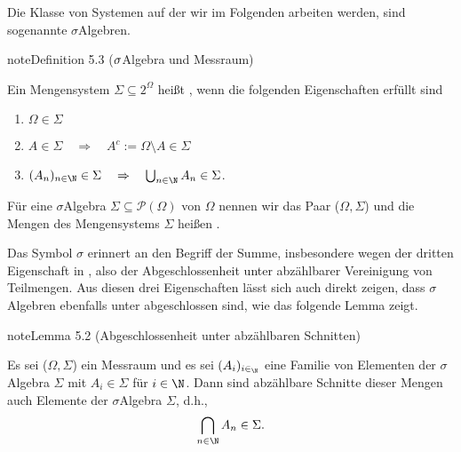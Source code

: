 \documentclass[letterpaper,10pt,german]{jupyterBook}
\begin{document}
\sphinxAtStartPar
Die Klasse von Systemen auf der wir im Folgenden arbeiten werden, sind sogenannte \(\sigma\)\sphinxhyphen{}Algebren.
\label{masstheorie/masstheorie:def:sigmaalgebra}
\begin{sphinxadmonition}{note}{Definition 5.3 (\protect\(\sigma\protect\)\sphinxhyphen{}Algebra und Messraum)}



\sphinxAtStartPar
Ein Mengensystem \(\Sigma \subseteq 2^\Omega\) heißt , wenn die folgenden Eigenschaften erfüllt sind
\begin{enumerate}
%
\item {} 
\sphinxAtStartPar
\(\Omega\in \Sigma\)

\item {} 
\sphinxAtStartPar
\(A\in \Sigma \quad \Rightarrow \quad A^c:=\Omega \setminus A\in \Sigma\)

\item {} 
\sphinxAtStartPar
\((A_n)_{n\in\N} \in \Sigma \quad \Rightarrow \quad \bigcup_{n\in \N} A_n\in \Sigma\).

\end{enumerate}

\sphinxAtStartPar
Für eine \(\sigma\)\sphinxhyphen{}Algebra \(\Sigma \subseteq \mathcal{P}(\Omega)\) von \(\Omega\) nennen wir das Paar (\(\Omega,\Sigma\))  und die Mengen des Mengensystems \(\Sigma\) heißen .
\end{sphinxadmonition}

\sphinxAtStartPar
Das Symbol \(\sigma\) erinnert an den Begriff der Summe, insbesondere wegen der dritten Eigenschaft in {\hyperref[\detokenize{masstheorie/masstheorie:def:sigmaalgebra}]{}}, also der Abgeschlossenheit unter abzählbarer Vereinigung von Teilmengen.
Aus diesen drei Eigenschaften lässt sich auch direkt zeigen, dass \(\sigma\)\sphinxhyphen{}Algebren ebenfalls unter  abgeschlossen sind, wie das folgende Lemma zeigt.
\label{masstheorie/masstheorie:lemma-6}
\begin{sphinxadmonition}{note}{Lemma 5.2 (Abgeschlossenheit unter abzählbaren Schnitten)}



\sphinxAtStartPar
Es sei (\(\Omega,\Sigma\)) ein Messraum und es sei \((A_i)_{i\in_\N}\) eine Familie von Elementen der \(\sigma\)\sphinxhyphen{}Algebra \(\Sigma\) mit \(A_i \in \Sigma\) für \(i \in \N\).
Dann sind abzählbare Schnitte dieser Mengen auch Elemente der \(\sigma\)\sphinxhyphen{}Algebra \(\Sigma\), d.h.,
\begin{equation*}
\begin{split}\bigcap_{n \in \N} A_n \in \Sigma.\end{split}
\end{equation*}\end{sphinxadmonition}
\end{document}
